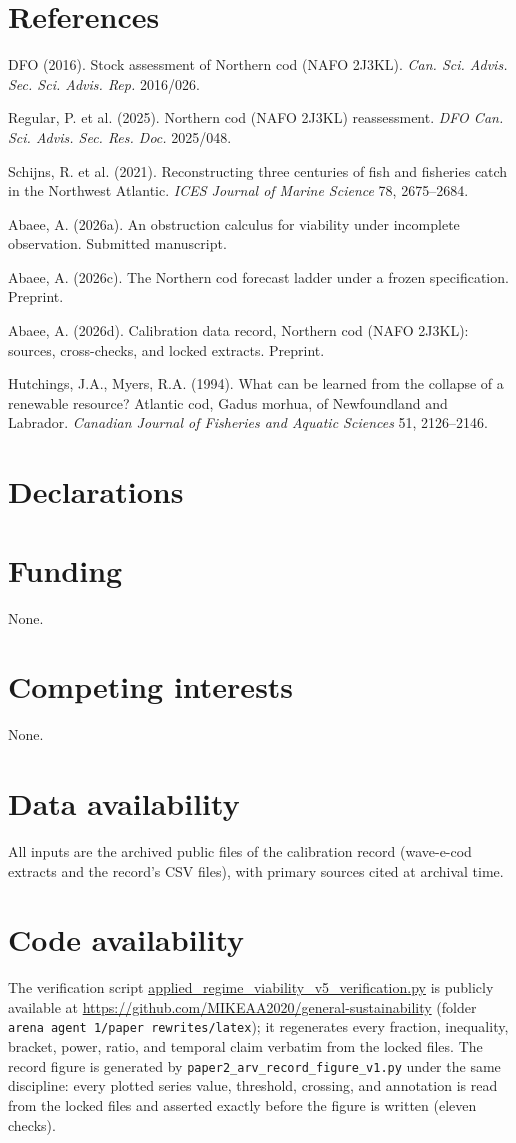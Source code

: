 \documentclass[10pt,twocolumn]{article}
\theoremstyle{plain}
\theoremstyle{remark}
\begin{document}
\section*{References}

{\footnotesize
DFO (2016). Stock assessment of Northern cod (NAFO 2J3KL). \emph{Can.
Sci. Advis. Sec. Sci. Advis. Rep.} 2016/026.

Regular, P. et al. (2025). Northern cod (NAFO 2J3KL) reassessment.
\emph{DFO Can. Sci. Advis. Sec. Res. Doc.} 2025/048.

Schijns, R. et al. (2021). Reconstructing three centuries of fish and
fisheries catch in the Northwest Atlantic. \emph{ICES Journal of Marine
Science} 78, 2675--2684.

Abaee, A. (2026a). An obstruction calculus for viability under
incomplete observation. Submitted manuscript.

Abaee, A. (2026c). The Northern cod forecast ladder under a frozen
specification. Preprint.

Abaee, A. (2026d). Calibration data record, Northern cod (NAFO 2J3KL):
sources, cross-checks, and locked extracts. Preprint.

Hutchings, J.A., Myers, R.A. (1994). What can be learned from the
collapse of a renewable resource? Atlantic cod, Gadus morhua, of
Newfoundland and Labrador. \emph{Canadian Journal of Fisheries and
Aquatic Sciences} 51, 2126--2146.
}

\section*{Declarations}

\section*{Funding}
None.

\section*{Competing interests}
None.

\section*{Data availability}
All inputs are the archived public files of the calibration record
(wave-e-cod extracts and the record's CSV files), with primary sources
cited at archival time.

\section*{Code availability}
The verification script
\url{applied_regime_viability_v5_verification.py}
is publicly available at
\url{https://github.com/MIKEAA2020/general-sustainability} (folder
\texttt{arena agent 1/paper rewrites/latex}); it regenerates every
fraction, inequality, bracket, power, ratio, and temporal claim
verbatim from the locked files. The record figure is generated by
\texttt{paper2\_arv\_record\_figure\_v1.py} under the same discipline:
every plotted series value, threshold, crossing, and annotation is read
from the locked files and asserted exactly before the figure is written
(eleven checks).
\end{document}

